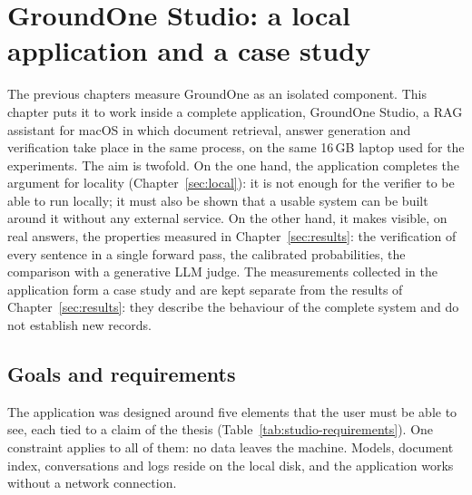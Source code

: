 \chapter{GroundOne Studio: a local application and a case study}
\label{ch:studio}


The previous chapters measure GroundOne as an isolated component. This chapter puts it to work inside a complete
application, GroundOne Studio, a RAG assistant for macOS in which document retrieval, answer generation and verification
take place in the same process, on the same 16\,GB laptop used for the experiments. The aim is twofold. On the one hand,
the application completes the argument for locality (Chapter~\ref{sec:local}): it is not enough for the verifier to be
able to run locally; it must also be shown that a usable system can be built around it without any external service. On
the other hand, it makes visible, on real answers, the properties measured in Chapter~\ref{sec:results}: the
verification of every sentence in a single forward pass, the calibrated probabilities, the comparison with a generative
LLM judge. The measurements collected in the application form a case study and are kept separate from the results of
Chapter~\ref{sec:results}: they describe the behaviour of the complete system and do not establish new records.

\section{Goals and requirements}
\label{sec:studio-goals}

The application was designed around five elements that the user must be able to see, each tied to a claim of the thesis
(Table~\ref{tab:studio-requirements}). One constraint applies to all of them: no data leaves the machine. Models,
document index, conversations and logs reside on the local disk, and the application works without a network
connection.

